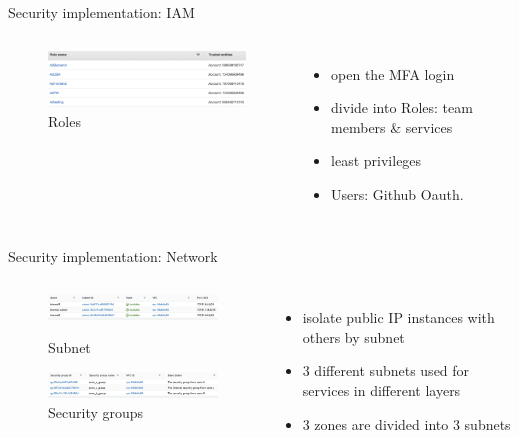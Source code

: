 \documentclass[aspectratio=169]{beamer}
\begin{document}
\begin{frame}[fragile]{Security implementation: IAM}

  \begin{columns}
      \begin{figure}[htbp]
        \centerline{\includegraphics[width=220pt]{images/roles.png}}
        \caption{Roles}
        \label{roles}
      \end{figure}
      \begin{itemize}
        \item open the MFA login
        \item divide into Roles: team members \& services
        \item least privileges
        \pause
        \item Users: Github Oauth.
      \end{itemize}
  \end{columns}

\end{frame}


\begin{frame}[fragile]{Security implementation: Network}

  \begin{columns}
      \begin{figure}[htbp]
        
        \centerline{\includegraphics[width=200pt]{images/subnet.png}}
        \caption{Subnet}

        \centerline{\includegraphics[width=200pt]{images/security.png}}
        \caption{Security groups}

      \end{figure}
      \begin{itemize}
        \item isolate public IP instances with others by subnet
        \pause
        \item 3 different subnets used for services in different layers
        \pause
        \item 3 zones are divided into 3 subnets
      \end{itemize}
  \end{columns}

\end{frame}
\end{document}
